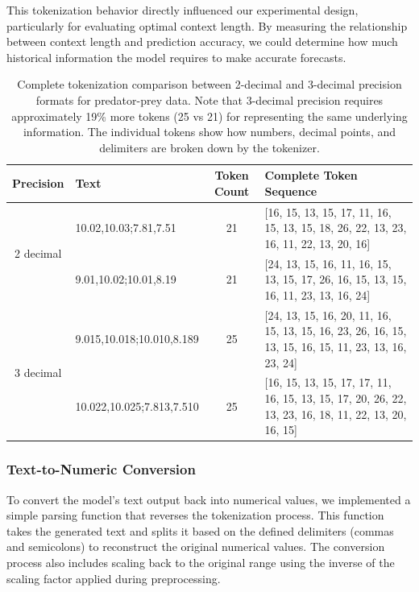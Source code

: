 \documentclass{article}
\begin{document}
This tokenization behavior directly influenced our experimental design, particularly for evaluating optimal context length. By measuring the relationship between context length and prediction accuracy, we could determine how much historical information the model requires to make accurate forecasts.

\begin{table}[H]
\centering
\begin{tabular}{cp{3cm}cp{6cm}}
\hline
\textbf{Precision} & \textbf{Text} & \textbf{Token Count} & \textbf{Complete Token Sequence} \\
\hline
\multirow{2}{*}{2 decimal} & 10.02,10.03;7.81,7.51 & 21 & [16, 15, 13, 15, 17, 11, 16, 15, 13, 15, 18, 26, 22, 13, 23, 16, 11, 22, 13, 20, 16] \\
\cline{2-4}
    & 9.01,10.02;10.01,8.19 & 21 & [24, 13, 15, 16, 11, 16, 15, 13, 15, 17, 26, 16, 15, 13, 15, 16, 11, 23, 13, 16, 24] \\
\hline
\multirow{2}{*}{3 decimal} & 9.015,10.018;10.010,8.189 & 25 & [24, 13, 15, 16, 20, 11, 16, 15, 13, 15, 16, 23, 26, 16, 15, 13, 15, 16, 15, 11, 23, 13, 16, 23, 24] \\
\cline{2-4}
    & 10.022,10.025;7.813,7.510 & 25 & [16, 15, 13, 15, 17, 17, 11, 16, 15, 13, 15, 17, 20, 26, 22, 13, 23, 16, 18, 11, 22, 13, 20, 16, 15] \\
\hline
\end{tabular}
\caption{Complete tokenization comparison between 2-decimal and 3-decimal precision formats for predator-prey data. Note that 3-decimal precision requires approximately 19\% more tokens (25 vs 21) for representing the same underlying information. The individual tokens show how numbers, decimal points, and delimiters are broken down by the tokenizer.}
\label{tab:precision_comparison}
\end{table}
\subsubsection*{Text-to-Numeric Conversion}

To convert the model's text output back into numerical values, we implemented a simple parsing function that reverses the tokenization process. This function takes the generated text and splits it based on the defined delimiters (commas and semicolons) to reconstruct the original numerical values. The conversion process also includes scaling back to the original range using the inverse of the scaling factor applied during preprocessing.
\end{document}
